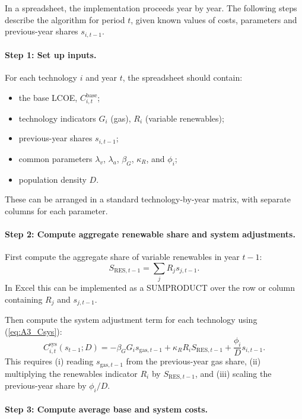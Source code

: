 \documentclass[preprint,authoryear,12pt]{elsarticle}
\begin{document}
In a spreadsheet, the implementation proceeds year by year. The following steps describe the
algorithm for period $t$, given known values of costs, parameters and previous-year shares
$s_{i,t-1}$.

\paragraph{Step 1: Set up inputs.}

For each technology $i$ and year $t$, the spreadsheet should contain:

\begin{itemize}
    \item the base LCOE, $C_{i,t}^{\text{base}}$;
    \item technology indicators $G_i$ (gas), $R_i$ (variable renewables);
    \item previous-year shares $s_{i,t-1}$;
    \item common parameters $\lambda_v$, $\lambda_a$, $\beta_G$, $\kappa_R$, and $\phi_i$;
    \item population density $D$.
\end{itemize}

These can be arranged in a standard technology-by-year matrix, with separate columns for each
parameter.

\paragraph{Step 2: Compute aggregate renewable share and system adjustments.}

First compute the aggregate share of variable renewables in year $t-1$:
\[
    S_{\text{RES},t-1} = \sum_j R_j s_{j,t-1}.
\]
In Excel this can be implemented as a SUMPRODUCT over the row or column containing $R_j$ and
$s_{j,t-1}$.

Then compute the system adjustment term for each technology using
(\ref{eq:A3_Csys}):
\[
    C_{i,t}^{\text{sys}}(s_{t-1};D)
    = - \beta_G G_i s_{\text{gas},t-1}
      + \kappa_R R_i S_{\text{RES},t-1}
      + \frac{\phi_i}{D} s_{i,t-1}.
\]
This requires (i) reading $s_{\text{gas},t-1}$ from the previous-year gas share, (ii) multiplying
the renewables indicator $R_i$ by $S_{\text{RES},t-1}$, and (iii) scaling the previous-year share
by $\phi_i / D$.

\paragraph{Step 3: Compute average base and system costs.}
\end{document}
